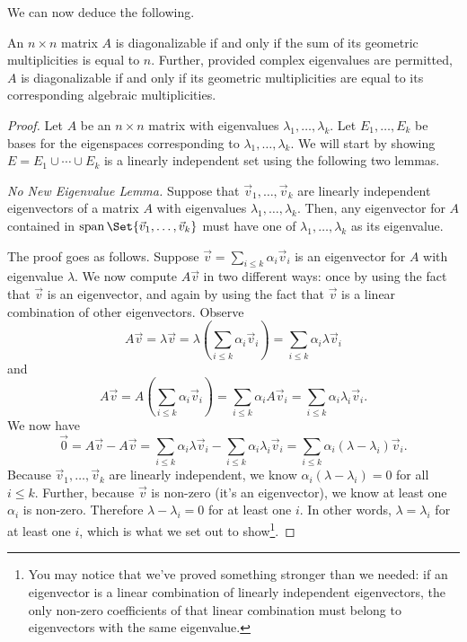 We can now deduce the following.
\begin{theorem}
	An $n\times n$ matrix $A$ is diagonalizable if and only if the sum of its geometric multiplicities
	is equal to $n$. Further, provided complex eigenvalues are permitted, $A$ is diagonalizable if and
	only if its geometric multiplicities are equal to its corresponding algebraic multiplicities.
\end{theorem}
\begin{proof}
	Let $A$ be an $n\times n$ matrix with eigenvalues $\lambda_1,\ldots,\lambda_k$. Let $E_1,\ldots,E_k$
	be bases for the eigenspaces corresponding to $\lambda_1,\ldots,\lambda_k$. We will start by showing $E=E_1\cup\cdots\cup E_k$
	is a linearly independent set using the following two lemmas.

	\emph{\color{myorange}No New Eigenvalue Lemma.} Suppose that $\vec v_1,\ldots,\vec v_k$ are linearly independent eigenvectors
	of a matrix $A$ with eigenvalues $\lambda_1,\ldots,\lambda_k$. Then, any eigenvector for $A$ contained in
	$\Span\Set{\vec v_1,\ldots,\vec v_k}$ must have one of $\lambda_1,\ldots,\lambda_k$ as its eigenvalue.

	The proof goes as follows. Suppose $\vec v=\sum_{i\leq k}\alpha_i\vec v_i$ is an eigenvector for $A$ with
	eigenvalue $\lambda$. We now compute $A\vec v$ in two different ways: once by using the fact that $\vec v$ is an eigenvector, and
	again by using the fact that $\vec v$ is a linear combination of other eigenvectors. Observe
	\[
		A\vec v=\lambda \vec v=\lambda\left(\sum_{i\leq k}\alpha_i\vec v_i\right)
		=\sum_{i\leq k}\alpha_i\lambda\vec v_i
	\]
	and
	\[
		A\vec v=A\left(\sum_{i\leq k}\alpha_i\vec v_i\right)
		=\sum_{i\leq k}\alpha_i A\vec v_i
		=\sum_{i\leq k}\alpha_i\lambda_i\vec v_i.
	\]
	We now have
	\[
		\vec 0=A\vec v-A\vec v = 
		\sum_{i\leq k}\alpha_i\lambda\vec v_i
		-\sum_{i\leq k}\alpha_i\lambda_i\vec v_i
		=\sum_{i\leq k}\alpha_i(\lambda-\lambda_i)\vec v_i.
	\]
	Because $\vec v_1,\ldots,\vec v_k$ are linearly independent, we know $\alpha_i(\lambda-\lambda_i)=0$ for all $i\leq k$.
	Further, because $\vec v$ is non-zero (it's an eigenvector),
	we know at least one $\alpha_i$ is non-zero. Therefore $\lambda-\lambda_i=0$ for at least one
	$i$. In other words, $\lambda=\lambda_i$ for at least one $i$, which is what we set out to show\footnote{ You may notice
	that we've proved something stronger than we needed: if an eigenvector is a linear combination of linearly independent eigenvectors,
	the only non-zero coefficients of that linear combination must belong to eigenvectors with the same eigenvalue.}.


\end{proof}
